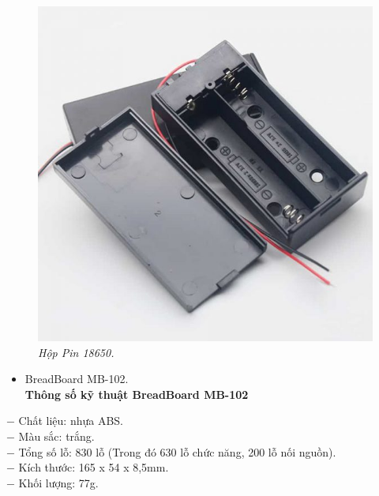 \documentclass[12pt,a4paper]{article}
\begin{document}
\begin{figure}[ht!]
    \centering
    \includegraphics[scale=0.8]{hinh 5.jpg}
    \caption{\textit{Hộp Pin 18650.}}
    \label{fig5}
\end{figure}
\newpage
\begin{itemize}
    \item BreadBoard MB-102.\\
    \textbf{Thông số kỹ thuật BreadBoard MB-102}
\end{itemize}
$-$ Chất liệu: nhựa ABS.\\
$-$ Màu sắc: trắng.\\
$-$ Tổng số lỗ: 830 lỗ (Trong đó 630 lỗ chức năng, 200 lỗ nối nguồn).\\
$-$ Kích thước: 165 x 54 x 8,5mm.\\
$-$ Khối lượng: 77g.\\
\end{document}

